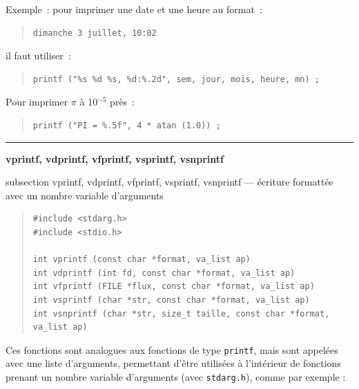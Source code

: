 \documentclass [twoside] {report}
\newcommand {\primitive} [1]
    {
	\phantomsection
	{\large \textbf {#1}}
	\addcontentsline {toc} {subsection} {#1}
    }
\newcommand {\separation}
    {
	\vspace {5mm}
	\nopagebreak
	\hrule
    }
\begin{document}
Exemple~: pour imprimer une date et une heure au format~: \par
\begin {quote}
\begin {verbatim}
dimanche 3 juillet, 10:02
\end{verbatim}
\end {quote}

il faut utiliser~:

\begin {quote}
\begin {verbatim}
printf ("%
\end{verbatim}
\end {quote}

Pour imprimer $\pi$ à 10$^{-5}$ près~:

\begin {quote}
\begin {verbatim}
printf ("PI = %
\end{verbatim}
\end {quote}


\separation
\primitive {vprintf, vdprintf, vfprintf, vsprintf, vsnprintf} --- écriture formattée avec un nombre variable d'arguments

\begin {quote}
\begin {verbatim}
#include <stdarg.h>
#include <stdio.h>

int vprintf (const char *format, va_list ap)
int vdprintf (int fd, const char *format, va_list ap)
int vfprintf (FILE *flux, const char *format, va_list ap)
int vsprintf (char *str, const char *format, va_list ap)
int vsnprintf (char *str, size_t taille, const char *format, va_list ap)
\end{verbatim}
\end {quote}

Ces fonctions sont analogues aux fonctions de type \texttt {printf}, mais
sont appelées avec une liste d'arguments, permettant d'être utilisées
à l'intérieur de fonctions prenant un nombre variable d'arguments
(avec \texttt {stdarg.h}), comme par exemple :
\end{document}
